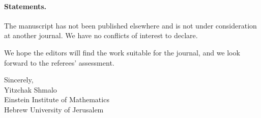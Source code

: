 \documentclass[11pt]{article}
\begin{document}
\paragraph{Statements.}
The manuscript has not been published elsewhere and is not under
consideration at another journal. We have no conflicts of interest to
declare.

We hope the editors will find the work suitable for the journal, and we
look forward to the referees' assessment.

\vspace{1.5em}
\noindent Sincerely, \\[1.0em]
Yitzchak Shmalo \\
Einstein Institute of Mathematics \\
Hebrew University of Jerusalem
\end{document}
